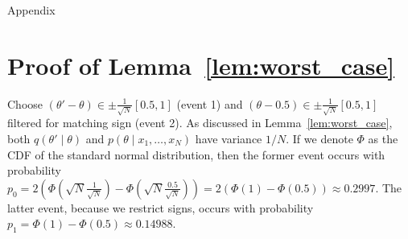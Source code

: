 \documentclass{article}
\begin{document}
\newpage




\clearpage
\appendix

\begin{center}
{\Large Appendix}
\end{center}

\section{Proof of Lemma~\ref{lem:worst_case}}\label{app:worst_case_proof}



Choose $(\theta' - \theta) \in \pm\frac{1}{\sqrt{N}}[0.5,1]$ (event 1) and $(\theta -0.5)
\in \pm\frac{1}{\sqrt{N}}[0.5,1]$ filtered for  matching sign (event 2).  As
discussed in Lemma~\ref{lem:worst_case}, both $q(\theta' \mid \theta)$ and
$p(\theta \mid x_1,\ldots,x_N)$ have variance $1/N$. If we denote $\Phi$ as the
CDF of the standard normal distribution, then the former event occurs with
probability $p_0 = 2(\Phi(\sqrt{N}\frac{1}{\sqrt{N}}) -
\Phi(\sqrt{N}\frac{0.5}{\sqrt{N}})) = 2(\Phi(1)-\Phi(0.5)) \approx 0.2997$. The
latter event, because we restrict signs, occurs with probability $p_1 =
\Phi(1) - \Phi(0.5) \approx 0.14988$. 
\end{document}
